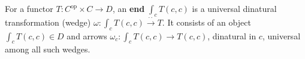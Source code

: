 For a functor $T: C^{\text{op}} \times C \rightarrow D$, an \textbf{end} $\int_c T(c, c)$ is a universal dinatural transformation (wedge) $\omega: \int_c T(c, c) \xrightarrow{\cdot\cdot} T$. It consists of an object $\int_c T(c, c) \in D$ and arrows $\omega_c: \int_c T(c, c) \rightarrow T(c, c)$, dinatural in $c$, universal among all such wedges.